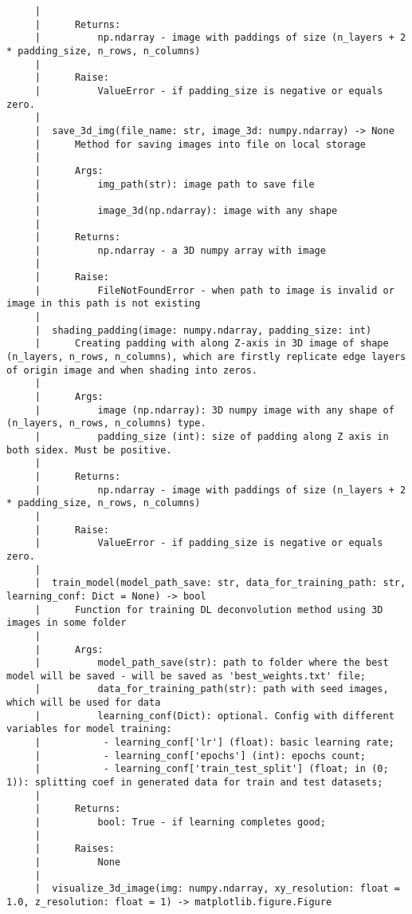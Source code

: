 \begin{lstlisting}
     |      
     |      Returns:
     |          np.ndarray - image with paddings of size (n_layers + 2 * padding_size, n_rows, n_columns)
     |      
     |      Raise:
     |          ValueError - if padding_size is negative or equals zero.
     |  
     |  save_3d_img(file_name: str, image_3d: numpy.ndarray) -> None
     |      Method for saving images into file on local storage
     |      
     |      Args:
     |          img_path(str): image path to save file
     |      
     |          image_3d(np.ndarray): image with any shape
     |      
     |      Returns:
     |          np.ndarray - a 3D numpy array with image
     |      
     |      Raise:
     |          FileNotFoundError - when path to image is invalid or image in this path is not existing
     |  
     |  shading_padding(image: numpy.ndarray, padding_size: int)
     |      Creating padding with along Z-axis in 3D image of shape (n_layers, n_rows, n_columns), which are firstly replicate edge layers of origin image and when shading into zeros.
     |      
     |      Args:
     |          image (np.ndarray): 3D numpy image with any shape of (n_layers, n_rows, n_columns) type.
     |          padding_size (int): size of padding along Z axis in both sidex. Must be positive.
     |      
     |      Returns:
     |          np.ndarray - image with paddings of size (n_layers + 2 * padding_size, n_rows, n_columns)
     |      
     |      Raise:
     |          ValueError - if padding_size is negative or equals zero.
     |  
     |  train_model(model_path_save: str, data_for_training_path: str, learning_conf: Dict = None) -> bool
     |      Function for training DL deconvolution method using 3D images in some folder
     |      
     |      Args:
     |          model_path_save(str): path to folder where the best model will be saved - will be saved as 'best_weights.txt' file;
     |          data_for_training_path(str): path with seed images, which will be used for data
     |          learning_conf(Dict): optional. Config with different variables for model training:
     |           - learning_conf['lr'] (float): basic learning rate;
     |           - learning_conf['epochs'] (int): epochs count;
     |           - learning_conf['train_test_split'] (float; in (0; 1)): splitting coef in generated data for train and test datasets;
     |      
     |      Returns:
     |          bool: True - if learning completes good;
     |      
     |      Raises:
     |          None
     |  
     |  visualize_3d_image(img: numpy.ndarray, xy_resolution: float = 1.0, z_resolution: float = 1) -> matplotlib.figure.Figure

\end{lstlisting}
